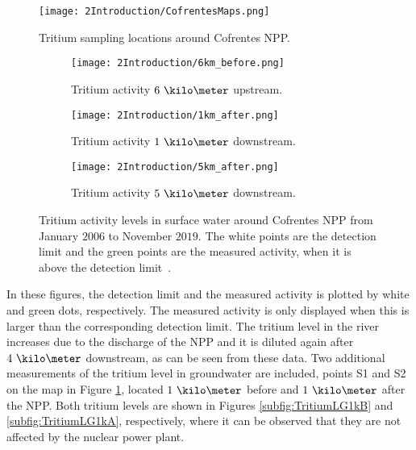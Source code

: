 \begin{figure}[hbtp]
\texttt{[image: 2Introduction/CofrentesMaps.png]}
\centering
\caption{Tritium sampling locations around Cofrentes NPP.\label{fig:SamplingLocations}}
\end{figure}

\begin{figure}
\centering
    \begin{subfigure}[b]{0.7\textwidth}
    \centering
    \texttt{[image: 2Introduction/6km\_before.png]}  
    \caption{Tritium activity $6~\kilo\meter$ upstream.\label{subfig:TritiumL6kB}}
    \end{subfigure}
    \hfill
    \begin{subfigure}[b]{0.7\textwidth}
    \centering
    \texttt{[image: 2Introduction/1km\_after.png]}  
    \caption{Tritium activity $1~\kilo\meter$ downstream.\label{subfig:TritiumL1kA}}
    \end{subfigure}
    \hfill
    \begin{subfigure}[b]{0.7\textwidth}
    \centering
    \texttt{[image: 2Introduction/5km\_after.png]}  
    \caption{Tritium activity $5~\kilo\meter$ downstream.\label{subfig:TritiumL5kA}}
    \end{subfigure}
 \caption{Tritium activity levels in surface water around Cofrentes NPP from January $2006$ to November $2019$. The white points are the detection limit and the green points are the measured activity, when it is above the detection limit~\cite{REM}.}
 \label{subfig:MeasurementsCofrentesSurface}
\end{figure}

In these figures, the detection limit and the measured activity is plotted by white and green dots, respectively. The measured activity is only displayed when this is larger than the corresponding detection limit. The tritium level in the river increases due to the discharge of the NPP and it is diluted again after $4~\kilo\meter$ downstream, as can be seen from these data. Two additional measurements of the tritium level in groundwater are included, points S1 and S2 on the map in Figure \ref{fig:SamplingLocations}, located $1~\kilo\meter$ before and $1~\kilo\meter$ after the NPP. Both tritium levels are shown in Figures \ref{subfig:TritiumLG1kB} and \ref{subfig:TritiumLG1kA}, respectively, where it can be observed that they are not affected by the nuclear power plant.

